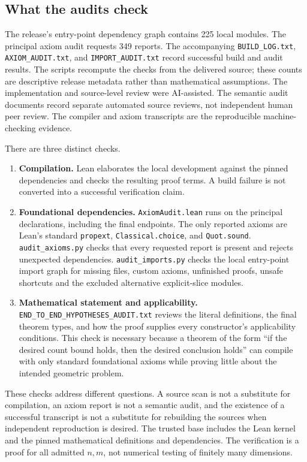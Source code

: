 \subsection{What the audits check}
\label{app:lean-audits}

The release's entry-point dependency graph contains 225 local modules.
The principal axiom audit requests 349 reports.  The accompanying
\nolinkurl{BUILD_LOG.txt}, \nolinkurl{AXIOM_AUDIT.txt}, and
\nolinkurl{IMPORT_AUDIT.txt} record successful build and audit results.
The scripts recompute the checks from the delivered source; these counts
are descriptive release metadata rather than mathematical assumptions.
The implementation and source-level review were AI-assisted.  The
semantic audit documents record separate automated source reviews, not
independent human peer review.  The compiler and axiom transcripts are
the reproducible machine-checking evidence.

There are three distinct checks.
\begin{enumerate}[leftmargin=*]
\item \textbf{Compilation.}  Lean elaborates the local development against
the pinned dependencies and checks the resulting proof terms.  A build
failure is not converted into a successful verification claim.
\item \textbf{Foundational dependencies.}
\nolinkurl{AxiomAudit.lean} runs \texttt{} on the principal
declarations, including the final endpoints.  The only reported axioms
are Lean's standard \nolinkurl{propext}, \nolinkurl{Classical.choice}, and
\nolinkurl{Quot.sound}.  \nolinkurl{audit_axioms.py} checks that every
requested report is present and rejects unexpected dependencies.
\nolinkurl{audit_imports.py} checks the local entry-point import graph for
missing files, custom axioms, unfinished proofs, unsafe shortcuts and the
excluded alternative explicit-slice modules.
\item \textbf{Mathematical statement and applicability.}
\nolinkurl{END_TO_END_HYPOTHESES_AUDIT.txt} reviews the literal definitions,
the final theorem types, and how the proof supplies every constructor's
applicability conditions.  This check is necessary because a theorem of
the form ``if the desired count bound holds, then the desired conclusion
holds'' can compile with only standard foundational axioms while proving
little about the intended geometric problem.
\end{enumerate}

These checks address different questions.  A source scan is not a
substitute for compilation, an axiom report is not a semantic audit, and
the existence of a successful transcript is not a substitute for rebuilding
the sources when independent reproduction is desired.  The trusted base
includes the Lean kernel and the pinned mathematical definitions and
dependencies.  The verification is a proof for all admitted $n,m$, not
numerical testing of finitely many dimensions.

